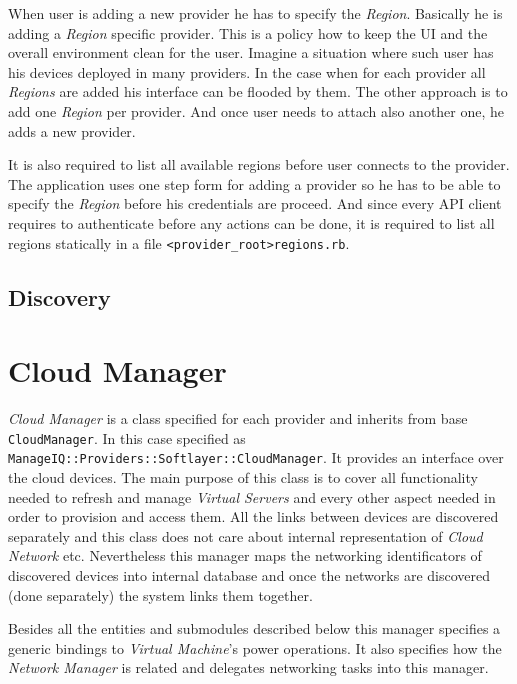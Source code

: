 When user is adding a new provider he has to specify the \emph{Region}. Basically he is adding a \emph{Region} specific provider. This is a policy how to keep the UI and the overall environment clean for the user. Imagine a situation where such user has his devices deployed in many providers. In the case when for each provider all \emph{Regions} are added his interface can be flooded by them. The other approach is to add one \emph{Region} per provider. And once user needs to attach also another one, he adds a new provider.

It is also required to list all available regions before user connects to the provider. The application uses one step form for adding a provider so he has to be able to specify the \emph{Region} before his credentials are proceed. And since every API client requires to authenticate before any actions can be done, it is required to list all regions statically in a file \verb|<provider_root>regions.rb|.

\subsection{Discovery}
\label{sub:Discovery}



\clearpage
\section{Cloud Manager}
\label{sec:Cloud Manager}

\emph{Cloud Manager} is a class specified for each provider and inherits from base \texttt{CloudManager}. In this case specified as \texttt{ManageIQ::Providers::Softlayer::CloudManager}. It provides an interface over the cloud devices. The main purpose of this class is to cover all functionality needed to refresh and manage \emph{Virtual Servers} and every other aspect needed in order to provision and access them. All the links between devices are discovered separately and this class does not care about internal representation of \emph{Cloud Network} etc. Nevertheless this manager maps the networking identificators of discovered devices into internal database and once the networks are discovered (done separately) the system links them together.

Besides all the entities and submodules described below this manager specifies a generic bindings to \emph{Virtual Machine}'s power operations. It also specifies how the \emph{Network Manager} is related and delegates networking tasks into this manager.

